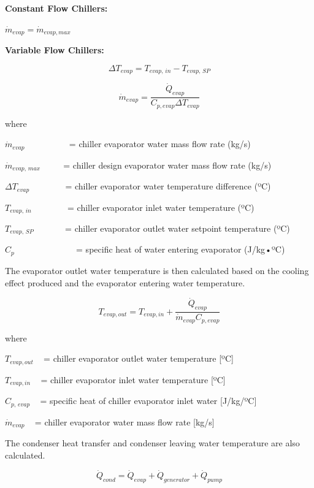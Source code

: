 \textbf{Constant Flow Chillers:}

\textbf{\({\dot m_{evap}} = {\dot m_{evap,max}}\)}

\textbf{Variable Flow Chillers:}

\begin{equation}
\Delta {T_{evap}} = {T_{evap,\,in}} - {T_{evap,\,SP}}
\end{equation}

\begin{equation}
  \dot{m}_{evap} = \frac{\dot{Q}_{evap}}{C_{p,evap} \Delta T_{evap}}
\end{equation}

where

\({\dot m_{evap}}\) ~~~~~~~~~ = chiller evaporator water mass flow rate (kg/s)

\({\dot m_{evap,\,max}}\) ~~~~ = chiller design evaporator water mass flow rate (kg/s)

\(\Delta {T_{evap}}\) ~~~~~~~ = chiller evaporator water temperature difference (ºC)

\({T_{evap,\,in}}\) ~~~~~~~ = chiller evaporator inlet water temperature (ºC)

\({T_{evap,\,SP}}\) ~~~~~~ = chiller evaporator outlet water setpoint temperature (ºC)

\({C_p}\) ~~~~~~~~~~~~~ = specific heat of water entering evaporator (J/kg•ºC)

The evaporator outlet water temperature is then calculated based on the cooling effect produced and the evaporator entering water temperature.

\begin{equation}
  T_{evap,out} = T_{evap,in} + \frac{\dot{Q}_{evap}}{\dot{m}_{evap}C_{p,evap}}
\end{equation}

where

\({T_{evap,out}}\) ~ = chiller evaporator outlet water temperature {[}ºC{]}

\({T_{evap,in}}\) ~ = chiller evaporator inlet water temperature {[}ºC{]}

\({C_{p,\,evap}}\) ~ = specific heat of chiller evaporator inlet water {[}J/kg/ºC{]}

\({\dot m_{evap}}\) ~ = chiller evaporator water mass flow rate {[}kg/s{]}

The condenser heat transfer and condenser leaving water temperature are also calculated.

\begin{equation}
{\dot Q_{cond}} = {\dot Q_{evap}} + {\dot Q_{generator}} + {\dot Q_{pump}}
\end{equation}

